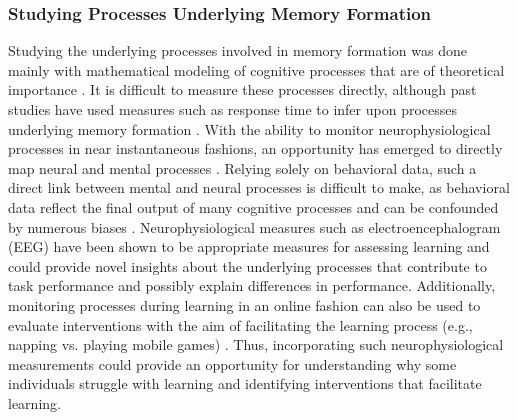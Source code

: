 \subsubsection{Studying Processes Underlying Memory Formation}
Studying the underlying processes involved in memory formation was done mainly with mathematical modeling of cognitive processes that are of theoretical importance \parencite{kahanaFoundationsHumanMemory2012, schallBuildingBridgeBrain2004}. It is difficult to measure these processes directly, although past studies have used measures such as response time to infer upon processes underlying memory formation \parencite[e.g.,][]{garnerOperationismConceptPerception1956}. With the ability to monitor neurophysiological processes in near instantaneous fashions, an opportunity has emerged to directly map neural and mental processes \parencite{schallBuildingBridgeBrain2004}.  Relying solely on behavioral data, such a direct link between mental and neural processes is difficult to make, as behavioral data reflect the final output of many cognitive processes \parencite{luuNeurophysiologicalMeasuresBrain2009} and can be confounded by numerous biases \parencite{webbUnobtrusiveMeasures1999}. 
Neurophysiological measures such as electroencephalogram (EEG) have been shown to be appropriate measures for assessing learning \parencite{tingaNoninvasiveNeurophysiologicalMeasures2019} and could provide novel insights about the underlying processes that contribute to task performance and possibly explain differences in performance\parencite[e.g.,][]{adamContributionAttentionalLapses2015,kimAdultADHDWorking2014}. Additionally, monitoring processes during learning in an online fashion can also be used to evaluate interventions with the aim of facilitating the learning process (e.g., napping vs. playing mobile games) \parencite{chiangEEGBasedDetectionModel2018}. Thus, incorporating such neurophysiological measurements could provide an opportunity for understanding why some individuals struggle with learning and identifying interventions that facilitate learning. 

